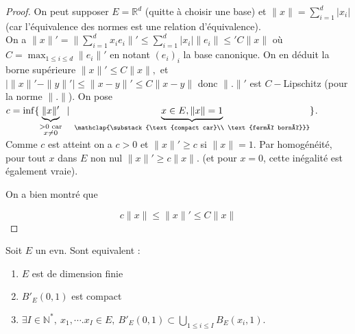 \begin{proof}
    On peut supposer $E=\mathbb{R} ^d$ (quitte à choisir une base) et $\|x\|=\sum\limits_{i=1}^{d} |x_i| $ (car l'équivalence des normes est une relation d'équivalence).\\
    On a $\|x\|'=\|\sum\limits_{i=1}^{d} x_ie_i\|'\le \sum\limits_{i=1}^{d} |x_i| \|e_i\| \leq 'C\|x\|$ où $C=\max_{1\le i\le d}\|e_i\|'$ en notant $(e_i)_i$ la base canonique. On en déduit la borne supérieure $\|x\|'\le C\|x\|,$ et $|\|x\|'-\|y\|'| \le \|x-y\|'\le C\|x-y\|$ donc $\|.\|'$ est $C-$Lipschitz (pour la norme $\|.\|$). On pose $c=\inf \{\underbrace{\|x\|'}_{\substack{>0\text{ car}\\x\neq 0}}\ |\ \underbrace{x\in E,\|x\|=1}_{\mathclap{\substack{\text{compact car}\\ \text{fermé borné}}}}\} $. Comme $c$ est atteint on a $c>0$ et $\|x\|'\ge c$ si $\|x\|=1$. Par homogénéité, pour tout $x$ dans $E$ non nul $\|x\|'\ge c\|x\|.$ (et pour $x=0$, cette inégalité est également vraie).

    On a bien montré que 

    $$c\|x\| \leq \|x\|' \leq C\|x\|$$
\end{proof}
\begin{theoreme}
    Soit $E$ un evn. Sont equivalent :
    
    \begin{enumerate}
        \item $E$ est de dimension finie
        \item $B'_E(0,1)$ est compact
        \item $\exists I\in \mathbb{N} ^*,\ x_1,\cdots.x_I\in E,\ B'_E(0,1)\subset \bigcup\limits_{1\le i\le I} B_E(x_i,1).$
    \end{enumerate}
\end{theoreme}
